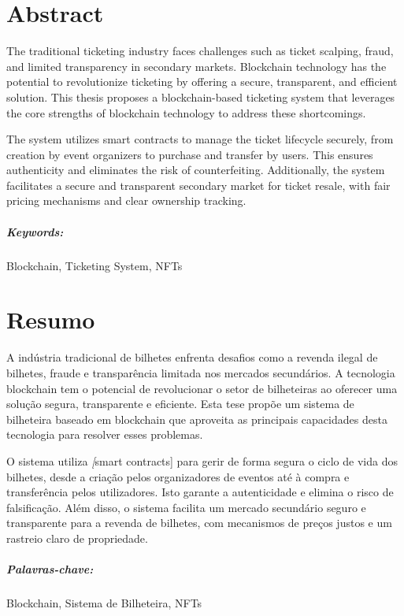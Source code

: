 \chapter*{Abstract}

The traditional ticketing industry faces challenges such as ticket scalping,
fraud, and limited transparency in secondary markets. Blockchain technology has
the potential to revolutionize ticketing by offering a secure, transparent, and
efficient solution. This thesis proposes a blockchain-based ticketing system
that leverages the core strengths of blockchain technology to address these
shortcomings.

The system utilizes smart contracts to manage the ticket lifecycle securely,
from creation by event organizers to purchase and transfer by users. This
ensures authenticity and eliminates the risk of counterfeiting. Additionally,
the system facilitates a secure and transparent secondary market for ticket
resale, with fair pricing mechanisms and clear ownership tracking.

\paragraph{Keywords:} Blockchain, Ticketing System, NFTs

\chapter*{Resumo}

A indústria tradicional de bilhetes enfrenta desafios como a revenda ilegal de
bilhetes, fraude e transparência limitada nos mercados secundários. A
tecnologia blockchain tem o potencial de revolucionar o setor de bilheteiras ao
oferecer uma solução segura, transparente e eficiente. Esta tese propõe um
sistema de bilheteira baseado em blockchain que aproveita as principais
capacidades desta tecnologia para resolver esses problemas.

O sistema utiliza \textit[smart contracts] para gerir de forma segura o ciclo
de vida dos bilhetes, desde a criação pelos organizadores de eventos até à
compra e transferência pelos utilizadores. Isto garante a autenticidade e
elimina o risco de falsificação. Além disso, o sistema facilita um mercado
secundário seguro e transparente para a revenda de bilhetes, com mecanismos de
preços justos e um rastreio claro de propriedade.

\paragraph{Palavras-chave:} Blockchain, Sistema de Bilheteira, NFTs